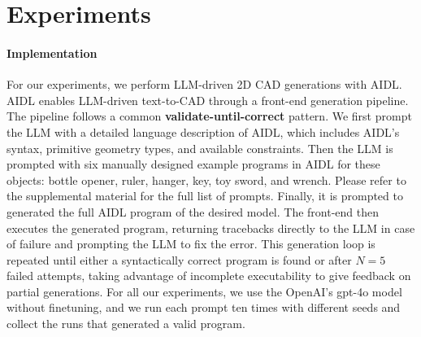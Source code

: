 
\section{Experiments}

\paragraph{Implementation}
For our experiments, we perform LLM-driven 2D CAD generations with AIDL. AIDL enables LLM-driven text-to-CAD through a front-end generation pipeline. The pipeline follows a common \textbf{validate-until-correct} pattern. 
We first prompt the LLM with a detailed language description of AIDL, which includes AIDL's syntax, primitive geometry types, and available constraints. Then the LLM is prompted with six manually designed example programs in AIDL for these objects: bottle opener, ruler, hanger, key, toy sword, and wrench. Please refer to the supplemental material for the full list of prompts. Finally, it is prompted to generated the full AIDL program of the desired model. The front-end then executes the generated program, returning tracebacks directly to the LLM in case of failure and prompting the LLM to fix the error. This generation loop is repeated until either a syntactically correct program is found or after $N=5$ failed attempts, taking advantage of incomplete executability to give feedback on partial generations. 
For all our experiments, we use the OpenAI's gpt-4o model without finetuning, and we run each prompt ten times with different seeds and collect the runs that generated a valid program.




